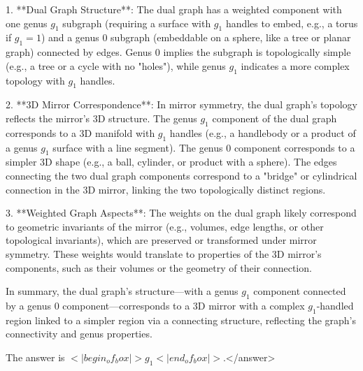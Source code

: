1. **Dual Graph Structure**: The dual graph has a weighted component with one genus \( g_1 \) subgraph (requiring a surface with \( g_1 \) handles to embed, e.g., a torus if \( g_1 = 1 \)) and a genus 0 subgraph (embeddable on a sphere, like a tree or planar graph) connected by edges. Genus 0 implies the subgraph is topologically simple (e.g., a tree or a cycle with no "holes"), while genus \( g_1 \) indicates a more complex topology with \( g_1 \) handles.  

2. **3D Mirror Correspondence**: In mirror symmetry, the dual graph’s topology reflects the mirror’s 3D structure. The genus \( g_1 \) component of the dual graph corresponds to a 3D manifold with \( g_1 \) handles (e.g., a handlebody or a product of a genus \( g_1 \) surface with a line segment). The genus 0 component corresponds to a simpler 3D shape (e.g., a ball, cylinder, or product with a sphere). The edges connecting the two dual graph components correspond to a "bridge" or cylindrical connection in the 3D mirror, linking the two topologically distinct regions.  

3. **Weighted Graph Aspects**: The weights on the dual graph likely correspond to geometric invariants of the mirror (e.g., volumes, edge lengths, or other topological invariants), which are preserved or transformed under mirror symmetry. These weights would translate to properties of the 3D mirror’s components, such as their volumes or the geometry of their connection.  

In summary, the dual graph’s structure—with a genus \( g_1 \) component connected by a genus 0 component—corresponds to a 3D mirror with a complex \( g_1 \)-handled region linked to a simpler region via a connecting structure, reflecting the graph’s connectivity and genus properties.  

The answer is \(<|begin_of_box|>g_1<|end_of_box|>\).</answer>